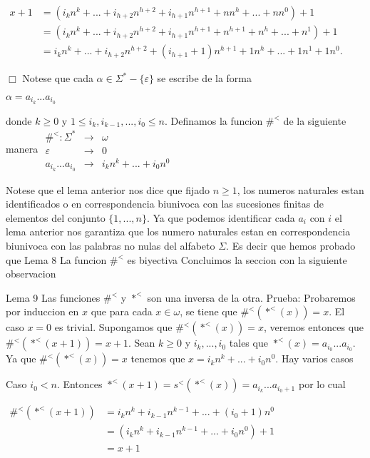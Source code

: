 \(\displaystyle \begin{array}{ll} x+1 & =\left( i_{k}n^{k}+...+i_{h+2}n^{h+2}+i_{h+1}n^{h+1}+nn^{h}+...+nn^{0}\right) +1 \\ & =\left( i_{k}n^{k}+...+i_{h+2}n^{h+2}+i_{h+1}n^{h+1}+n^{h+1}+n^{h}+...+n^{1}\right) +1 \\ & =i_{k}n^{k}+...+i_{h+2}n^{h+2}+(i_{h+1}+1)n^{h+1}+1n^{h}+...+1n^{1}+1n^{0}. \end{array} \)

\(\Box\)
Notese que cada \(\alpha \in \Sigma ^{\ast }-\{\varepsilon \}\) se escribe de la forma

\(\displaystyle \alpha =a_{i_{k}}...a_{i_{0}} \)

donde \(k\geq 0\) y \(1\leq i_{k},i_{k-1},...,i_{0}\leq n\). Definamos la funcion \(\#^{< }\) de la siguiente manera
\(\displaystyle \begin{array}{rll} \#^{< }:\Sigma ^{\ast } & \rightarrow & \omega \\ \varepsilon & \rightarrow & 0 \\ a_{i_{k}}...a_{i_{0}} & \rightarrow & i_{k}n^{k}+...+i_{0}n^{0} \end{array} \)

Notese que el lema anterior nos dice que fijado \(n\geq 1\), los numeros naturales estan identificados o en correspondencia biunivoca con las sucesiones finitas de elementos del conjunto \(\{1,...,n\}\). Ya que podemos identificar cada \(a_{i}\) con \(i\) el lema anterior nos garantiza que los numero naturales estan en correspondencia biunivoca con las palabras no nulas del alfabeto \(\Sigma \). Es decir que hemos probado que
Lema 8 La funcion \(\#^{< }\) es biyectiva
Concluimos la seccion con la siguiente observacion

Lema 9 Las funciones \(\#^{< }\) y \(\ast ^{< }\) son una inversa de la otra.
Prueba: Probaremos por induccion en \(x\) que para cada \(x\in \omega \), se tiene que \( \#^{< }(\ast ^{< }(x))=x\). El caso \(x=0\) es trivial. Supongamos que \( \#^{< }(\ast ^{< }(x))=x\), veremos entonces que \(\#^{< }(\ast ^{< }(x+1))=x+1\). Sean \(k\geq 0\) y \(i_{k},...,i_{0}\) tales que \(\ast ^{< }(x)=a_{i_{0}}...a_{i_{0}}\). Ya que \(\#^{< }(\ast ^{< }(x))=x\) tenemos que \( x=i_{k}n^{k}+...+i_{0}n^{0}\). Hay varios casos

Caso \(i_{0}< n\). Entonces \(\ast ^{< }(x+1)=s^{< }(\ast ^{< }(x))=a_{i_{k}}...a_{i_{0}+1}\) por lo cual

\(\displaystyle \begin{array}{ll} \#^{< }(\ast ^{< }(x+1)) & =i_{k}n^{k}+i_{k-1}n^{k-1}+...+(i_{0}+1)n^{0} \\ & =\left( i_{k}n^{k}+i_{k-1}n^{k-1}+...+i_{0}n^{0}\right) +1 \\ & =x+1 \end{array} \)

